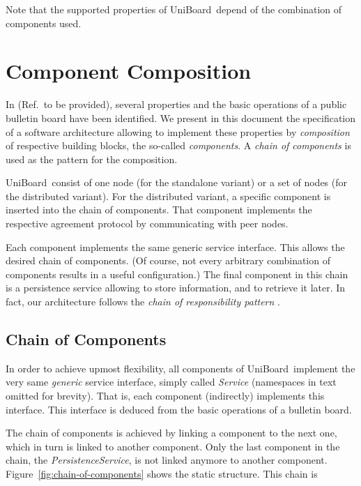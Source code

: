 \documentclass[oneside]{scrreprt}
\newcommand{\uniboard}{\mbox{UniBoard}}
\newcommand{\fig}[1]{Figure~\ref{#1}}
\begin{document}
Note that the supported properties of \uniboard\ depend of the combination of components used.

\chapter{Component Composition}

In (Ref.\ to be provided), several properties and the basic operations of a public bulletin
board have been identified. We present in this document the
specification of a software architecture allowing to implement
these properties by \emph{composition} of respective building
blocks, the so-called \emph{components}. A
\emph{chain of components} is used as the pattern for the
composition.

\uniboard\ consist of one node (for the standalone variant) or
a set of nodes (for the distributed variant). For the
distributed variant, a specific component is inserted
into the chain of components. That component implements
the respective agreement protocol by communicating with
peer nodes.

Each component implements the same generic service interface.
This allows the desired chain of components. (Of
course, not every arbitrary combination of components results
in a useful configuration.) The final component in this chain
is a persistence service allowing to store information, and
to retrieve it later. In fact, our architecture follows the
\emph{chain of responsibility pattern} \cite{Gamma:1995:DPE:186897}.


\section{Chain of Components}

In order to achieve upmost flexibility, all components of
\uniboard\ implement the very same \emph{generic} service
interface, simply called \emph{Service} (namespaces in text
omitted for brevity). That is, each component (indirectly)
implements this interface. This interface is deduced from the 
basic operations of a bulletin board.

The chain of components is achieved by linking a component
to the next one, which in turn is linked to another component.
Only the last component in the chain, the \emph{PersistenceService}, is not
linked anymore to another component. \fig{fig:chain-of-components}
shows the static structure. This chain is 
\end{document}
